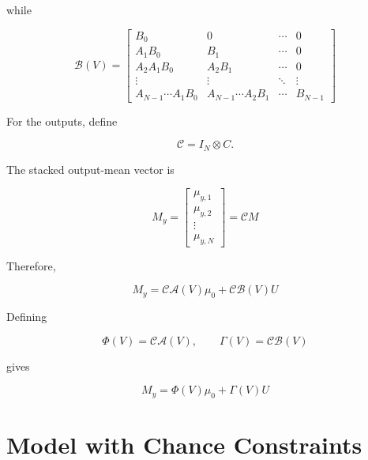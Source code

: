 while

\begin{equation}
\mathcal{B}(V)
=
\begin{bmatrix}
B_0 & 0 & \cdots & 0\\
A_1B_0 & B_1 & \cdots & 0\\
A_2A_1B_0 & A_2B_1 & \cdots & 0\\
\vdots & \vdots & \ddots & \vdots\\
A_{N-1}\cdots A_1B_0 &
A_{N-1}\cdots A_2B_1 &
\cdots &
B_{N-1}
\end{bmatrix}
\end{equation}

For the outputs, define

\begin{equation}
    \mathcal{C}=I_N\otimes C.
\end{equation}

The stacked output-mean vector is

\begin{equation}
    M_y
    =
    \begin{bmatrix}
        \mu_{y,1}\\
        \mu_{y,2}\\
        \vdots\\
        \mu_{y,N}
    \end{bmatrix}
    =
    \mathcal{C}M
\end{equation}

Therefore,

\begin{equation}
    M_y
    =
    \mathcal{C}\mathcal{A}(V)\mu_0
    +
    \mathcal{C}\mathcal{B}(V)U
\end{equation}

Defining

\begin{equation}
    \Phi(V)
    =
    \mathcal{C}\mathcal{A}(V),
    \qquad
    \Gamma(V)
    =
    \mathcal{C}\mathcal{B}(V)
\end{equation}

gives

\begin{equation}
    \boxed{
    M_y
    =
    \Phi(V)\mu_0
    +
    \Gamma(V)U
    }
    \label{eq:sb_stacked_output}
\end{equation}

\section{Model with Chance Constraints}
\label{sec:sb_chance_constraints}

